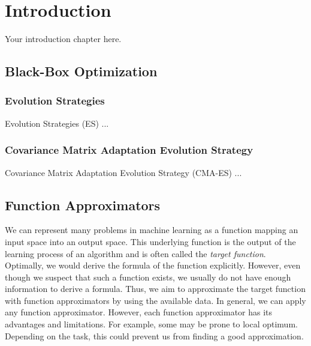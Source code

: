 
\chapter{Introduction}
\label{ch:introduction}

Your introduction chapter here.

\section{Black-Box Optimization}
\subsection{Evolution Strategies}
Evolution Strategies (ES) ...

\subsection{Covariance Matrix Adaptation Evolution Strategy}
Covariance Matrix Adaptation Evolution Strategy (CMA-ES) ...

\section{Function Approximators}
We can represent many problems in machine learning as a function mapping an input space into an output space. This underlying function is the output of the learning process of an algorithm and is often called the \textit{target function}. Optimally, we would derive the formula of the function explicitly. However, even though we suspect that such a function exists, we usually do not have enough information to derive a formula. Thus, we aim to approximate the target function with function approximators by using the available data. In general, we can apply any function approximator. However, each function approximator has its advantages and limitations. For example, some may be prone to local optimum. Depending on the task, this could prevent us from finding a good approximation.

